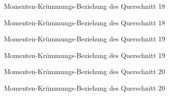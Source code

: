 \documentclass[
  11pt,
  letterpaper,
]{scrreprt}
\begin{document}
\begin{figure}[H]


\caption{\label{fig-qs_18}Momenten-Krümmungs-Beziehung des Querschnitt
18}

\end{figure}%

\begin{figure}[H]


\caption{\label{fig-m_chi_18}Momenten-Krümmungs-Beziehung des
Querschnitt 18}

\end{figure}%

\begin{figure}[H]


\caption{\label{fig-qs_19}Momenten-Krümmungs-Beziehung des Querschnitt
19}

\end{figure}%

\begin{figure}[H]


\caption{\label{fig-m_chi_19}Momenten-Krümmungs-Beziehung des
Querschnitt 19}

\end{figure}%

\begin{figure}[H]


\caption{\label{fig-qs_20}Momenten-Krümmungs-Beziehung des Querschnitt
20}

\end{figure}%

\begin{figure}[H]


\caption{\label{fig-m_chi_20}Momenten-Krümmungs-Beziehung des
Querschnitt 20}

\end{figure}%
\end{document}
